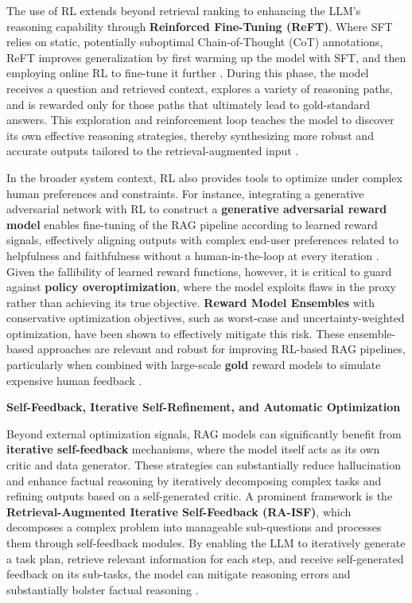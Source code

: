 \documentclass[11pt]{article}
\begin{document}
The use of RL extends beyond retrieval ranking to enhancing the LLM's reasoning capability through \textbf{Reinforced Fine-Tuning (ReFT)}. Where SFT relies on static, potentially suboptimal Chain-of-Thought (CoT) annotations, ReFT improves generalization by first warming up the model with SFT, and then employing online RL to fine-tune it further \cite{ref228}. During this phase, the model receives a question and retrieved context, explores a variety of reasoning paths, and is rewarded only for those paths that ultimately lead to gold-standard answers. This exploration and reinforcement loop teaches the model to discover its own effective reasoning strategies, thereby synthesizing more robust and accurate outputs tailored to the retrieval-augmented input \cite{ref229}.

In the broader system context, RL also provides tools to optimize under complex human preferences and constraints. For instance, integrating a generative adversarial network with RL to construct a \textbf{generative adversarial reward model} enables fine-tuning of the RAG pipeline according to learned reward signals, effectively aligning outputs with complex end-user preferences related to helpfulness and faithfulness without a human-in-the-loop at every iteration \cite{ref230}. Given the fallibility of learned reward functions, however, it is critical to guard against \textbf{policy overoptimization}, where the model exploits flaws in the proxy rather than achieving its true objective. \textbf{Reward Model Ensembles} with conservative optimization objectives, such as worst-case and uncertainty-weighted optimization, have been shown to effectively mitigate this risk. These ensemble-based approaches are relevant and robust for improving RL-based RAG pipelines, particularly when combined with large-scale \textbf{gold} reward models to simulate expensive human feedback \cite{ref231}.

\textbf{Self-Feedback, Iterative Self-Refinement, and Automatic Optimization}

Beyond external optimization signals, RAG models can significantly benefit from \textbf{iterative self-feedback} mechanisms, where the model itself acts as its own critic and data generator. These strategies can substantially reduce hallucination and enhance factual reasoning by iteratively decomposing complex tasks and refining outputs based on a self-generated critic. A prominent framework is the \textbf{Retrieval-Augmented Iterative Self-Feedback (RA-ISF)}, which decomposes a complex problem into manageable sub-questions and processes them through self-feedback modules. By enabling the LLM to iteratively generate a task plan, retrieve relevant information for each step, and receive self-generated feedback on its sub-tasks, the model can mitigate reasoning errors and substantially bolster factual reasoning \cite{ref42}.
\end{document}
